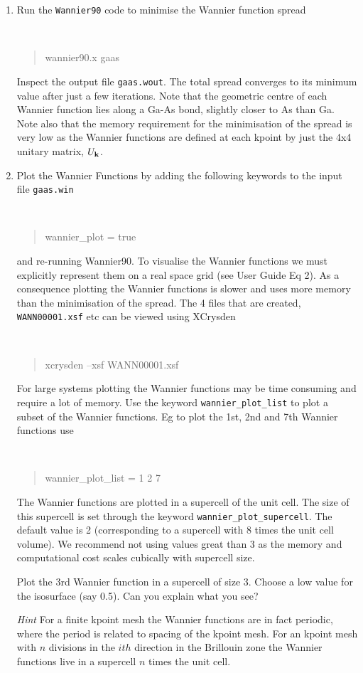 \documentclass[a4paper,11pt,twoside]{article}
\begin{document}
\begin{enumerate}
\item Run the {\tt Wannier90} code to minimise the Wannier function spread
{\tt
\begin{quote}
wannier90.x gaas
\end{quote} }
Inspect the output file {\tt gaas.wout}. The total spread converges to its
minimum value after just a few iterations. Note that the geometric centre of
each Wannier function lies along a Ga-As bond, slightly closer to As than Ga. Note also that the memory requirement for the minimisation of the spread is very low as the Wannier functions are defined at each kpoint by just the 4x4 unitary matrix, $U_{{\bf k}}$.
\item Plot the Wannier Functions by adding the following keywords to the input file {\tt gaas.win}
{\tt
\begin{quote}
wannier\_plot = true
\end{quote} }
and re-running Wannier90. To visualise the Wannier functions we must explicitly represent them on
a real space grid (see User Guide Eq 2). As a consequence plotting the Wannier functions is slower and uses more memory than the minimisation of the spread. The 4 files that are created, {\tt WANN00001.xsf} etc can be viewed using XCrysden
{\tt
\begin{quote}
xcrysden --xsf WANN00001.xsf
\end{quote} }

For large systems plotting the Wannier functions may be time consuming and require a lot of memory. Use the keyword {\tt wannier\_plot\_list} to plot a subset of the Wannier functions. Eg to plot the 1st, 2nd and 7th Wannier functions use
{\tt
\begin{quote}
wannier\_plot\_list = 1 2 7
\end{quote} }
The Wannier functions are plotted in a supercell of the unit cell. The size of this supercell is set through the keyword {\tt wannier\_plot\_supercell}. The default value is 2 (corresponding to a supercell with 8 times the unit cell volume). We recommend not using values great than 3 as the memory and computational cost scales cubically with  supercell size. 

Plot the 3rd Wannier function in a supercell of size 3. Choose a low value for the isosurface (say 0.5). Can you explain what you see?


{\it Hint} For a finite kpoint mesh the Wannier functions are in fact periodic, where the period is related to spacing of the kpoint mesh. For an kpoint mesh with $n$ divisions in the $ith$ direction in the Brillouin zone the Wannier functions live in a supercell $n$ times the unit cell.
\end{enumerate}
\end{document}
